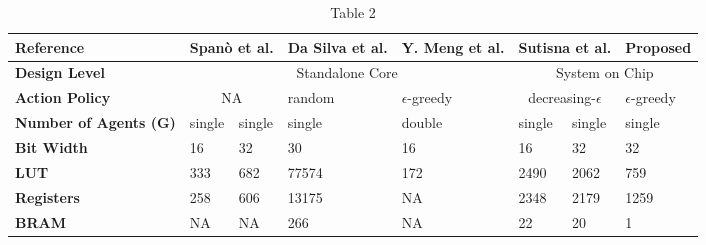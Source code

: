 \begin{table}[H]
	\centering
	\caption{Table 2}
	\label{tabref2}
	\renewcommand{\arraystretch}{1.2}
	\setlength{\tabcolsep}{3pt}
	\begin{tabularx}{\textwidth}{|p{20mm}|X|X|X|X|X|X|X|}
		\hline
		\textbf{Reference}            & \multicolumn{2}{c|}{Spanò et al. } 								 & Da Silva et al. 								   & Y. Meng et al. 							& \multicolumn{2}{c|}{Sutisna et al. 							   } & Proposed                            \\ \hline
		\textbf{Design Level}         & \multicolumn{4}{c|}{Standalone Core}                             & \multicolumn{3}{c|}{System on Chip}                                                                                                                                                                     \\ \hline
		\textbf{Action Policy}        & \multicolumn{2}{c|}{NA}                                          & random                                          & $\epsilon$-greedy                          & \multicolumn{2}{c|}{decreasing-$\epsilon$}                         & $\epsilon$-greedy                   \\ \hline
		\textbf{Number of Agents (G)} & single                                                           & single                                          & single                                     & double                                                             & single            & single & single \\ \hline
		\textbf{Bit Width}            & 16                                                               & 32                                              & 30                                         & 16                                                                 & 16                & 32     & 32     \\ \hline
		\textbf{LUT}                  & 333                                                              & 682                                             & 77574                                      & 172                                                                & 2490              & 2062   & 759    \\ \hline
		\textbf{Registers}            & 258                                                              & 606                                             & 13175                                      & NA                                                                 & 2348              & 2179   & 1259   \\ \hline
		\textbf{BRAM}                 & NA                                                               & NA                                              & 266                                        & NA                                                                 & 22                & 20     & 1      \\ \hline
	\end{tabularx}
\end{table}




